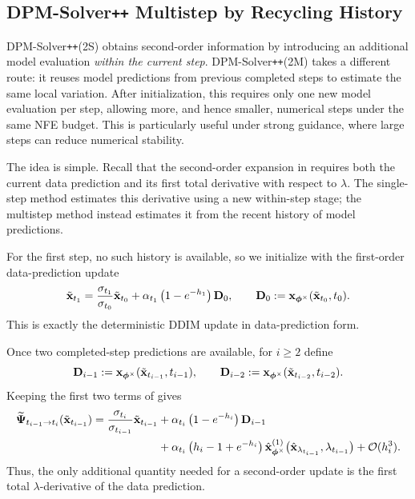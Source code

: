 \subsection{DPM-Solver\texttt{++} Multistep by Recycling History}
\label{subsec:dpm-solver++-multi}

DPM-Solver\texttt{++}(2S) obtains second-order information by introducing an
additional model evaluation \emph{within the current step}.
DPM-Solver\texttt{++}(2M) takes a different route: it reuses model
predictions from previous completed steps to estimate the same local
variation. After initialization, this requires only one new model evaluation
per step, allowing more, and hence smaller, numerical steps under the same
NFE budget. This is particularly useful under strong guidance, where large
steps can reduce numerical stability.

The idea is simple. Recall that the second-order expansion in
 requires both the current data prediction
and its first total derivative with respect to $\lambda$. The single-step
method estimates this derivative using a new within-step stage; the multistep
method instead estimates it from the recent history of model predictions.

For the first step, no such history is available, so we initialize with the
first-order data-prediction update
\[
\tilde{{\mathbf{x}}}_{t_1}
=
\frac{\sigma_{t_1}}{\sigma_{t_0}}
\tilde{{\mathbf{x}}}_{t_0}
+
\alpha_{t_1}
\left(
1-e^{-h_1}
\right)
{\mathbf{D}}_0,
\qquad
{\mathbf{D}}_0
:=
{\mathbf{x}}_{\bm{\phi}^\times}
(\tilde{{\mathbf{x}}}_{t_0},t_0).
\]
This is exactly the deterministic DDIM update in data-prediction form.

Once two completed-step predictions are available, for $i\geq2$ define
\[
{\mathbf{D}}_{i-1}
:=
{\mathbf{x}}_{\bm{\phi}^\times}
(\tilde{{\mathbf{x}}}_{t_{i-1}},t_{i-1}),
\qquad
{\mathbf{D}}_{i-2}
:=
{\mathbf{x}}_{\bm{\phi}^\times}
(\tilde{{\mathbf{x}}}_{t_{i-2}},t_{i-2}).
\]
Keeping the first two terms of
 gives
\begin{align*}
\widetilde{{\bm{\Psi}}}_{t_{i-1}\to t_i}
(\tilde{{\mathbf{x}}}_{t_{i-1}})
=
\frac{\sigma_{t_i}}{\sigma_{t_{i-1}}}
\tilde{{\mathbf{x}}}_{t_{i-1}}
&+
\alpha_{t_i}
\left(
1-e^{-h_i}
\right)
{\mathbf{D}}_{i-1}
\\
&+
\alpha_{t_i}
\left(
h_i-1+e^{-h_i}
\right)
\hat{{\mathbf{x}}}_{\bm{\phi}^\times}^{(1)}
\bigl(
\hat{{\mathbf{x}}}_{\lambda_{t_{i-1}}},
\lambda_{t_{i-1}}
\bigr)
+
\mathcal O(h_i^3).
\end{align*}
Thus, the only additional quantity needed for a second-order update is the
first total $\lambda$-derivative of the data prediction.

